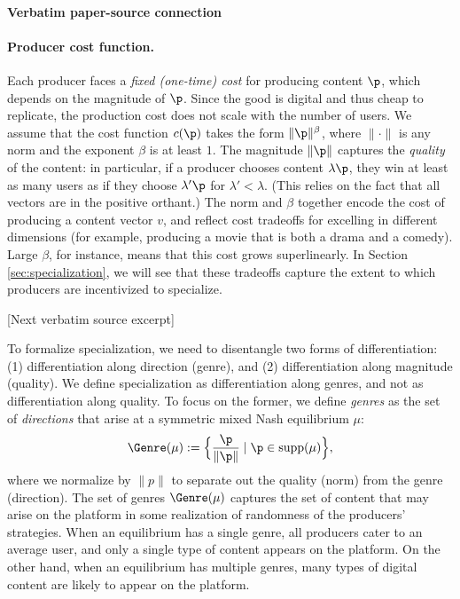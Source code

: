 \documentclass[10pt]{article}
\begin{document}
\paragraph{Verbatim paper-source connection}
\begin{ReviewVerbatim}
\paragraph{Producer cost function.} Each producer faces a \textit{fixed (one-time) cost} for producing content $\p$, which depends on the magnitude of $\p$. Since the good is digital and thus cheap to replicate, the production cost does not scale with the number of users.
We assume that the cost function $c(\p)$ takes the form $\|\p\|^{\beta}$, where $\|\cdot\|$ is any norm and the exponent $\beta$ is at least $1$. The magnitude $\|\p\|$ captures the \textit{quality} of the content: in particular, if a producer chooses content $\lambda \p$, they win at least as many users as if they choose $\lambda' \p$ for $\lambda' < \lambda$. (This relies on the fact that all vectors are in the positive orthant.) The norm and $\beta$ together encode the cost of producing a content vector $v$, and reflect cost tradeoffs for excelling in different dimensions (for example, producing a movie that is both a drama and a comedy). Large $\beta$, for instance, means that this cost grows superlinearly. In Section \ref{sec:specialization}, we will see that these tradeoffs capture the extent to which producers are incentivized to specialize.

[Next verbatim source excerpt]

To formalize specialization, we need to disentangle two forms of differentiation: (1) differentiation along direction (genre), and (2) differentiation along magnitude (quality). We define specialization as differentiation along genres, and not as differentiation along quality. To focus on the former, we define \textit{genres} as the set of \textit{directions} that arise at a symmetric mixed Nash equilibrium $\mu$:
\begin{equation}
\label{eq:genredef}
 \Genre(\mu) := \Big\{\frac{\p}{\|\p\|} \mid \p \in \text{supp}(\mu) \Big\},
\end{equation}
where we normalize by $\|p\|$ to separate out the quality (norm) from the genre (direction). The set of genres $ \Genre(\mu)$ captures the set of content that may arise on the platform in some realization of randomness of the producers' strategies. When an equilibrium has a single genre, all producers cater to an average user, and only a single type of content appears  on the platform. On the other hand, when an equilibrium has multiple genres, many types of digital content are likely to appear on the platform.




\end{ReviewVerbatim}
\end{document}
